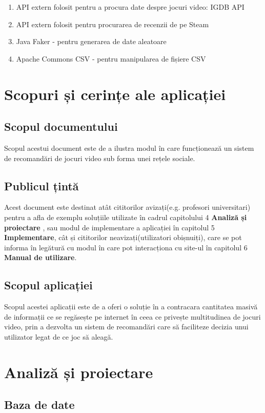 \documentclass[12pt,a4paper]{report}
\begin{document}
\begin{enumerate}
  \item API extern folosit pentru a procura date despre jocuri video: IGDB API \cite{1}
  \item API extern folosit pentru procurarea de recenzii de pe Steam \cite{2}
  \item Java Faker - pentru generarea de date aleatoare \cite{3}
  \item Apache Commons CSV - pentru manipularea de fișiere CSV \cite{4}
\end{enumerate}


\section{Scopuri și cerințe ale aplicației}
\subsection{Scopul documentului}
Scopul acestui document este de a ilustra modul în care funcționează un sistem de recomandări de jocuri video sub forma unei rețele sociale.
\subsection{Publicul țintă}
Acest document este destinat atât cititorilor avizați(e.g. profesori universitari) pentru a afla de exemplu soluțiile utilizate în cadrul capitolului 4 \textbf{Analiză și proiectare} , sau modul de implementare a aplicației în capitolul 5 \textbf{Implementare}, cât și cititorilor neavizați(utilizatori obișnuiți), care se pot informa în legătură cu modul în care pot interacționa cu site-ul în capitolul 6 \textbf{Manual de utilizare}.
\subsection{Scopul aplicației}
Scopul acestei aplicații este de a oferi o soluție în a contracara cantitatea masivă de informații ce se regăsește pe internet \cite{5} în ceea ce privește multitudinea de jocuri video, prin a dezvolta un sistem de recomandări care să faciliteze decizia unui utilizator legat de ce joc să aleagă.  




\section{Analiză și proiectare}
\subsection{Baza de date}
\end{document}
